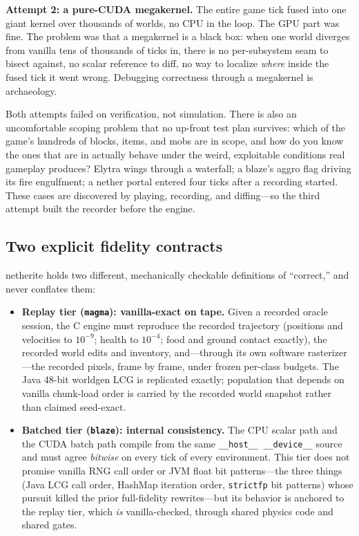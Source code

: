 \documentclass[11pt]{article}
\begin{document}
\textbf{Attempt 2: a pure-CUDA megakernel.} The entire game tick fused into one giant kernel over thousands of worlds, no CPU in the loop. The GPU part was fine. The problem was that a megakernel is a black box: when one world diverges from vanilla tens of thousands of ticks in, there is no per-subsystem seam to bisect against, no scalar reference to diff, no way to localize \emph{where} inside the fused tick it went wrong. Debugging correctness through a megakernel is archaeology.

Both attempts failed on verification, not simulation. There is also an uncomfortable scoping problem that no up-front test plan survives: which of the game's hundreds of blocks, items, and mobs are in scope, and how do you know the ones that are in actually behave under the weird, exploitable conditions real gameplay produces? Elytra wings through a waterfall; a blaze's aggro flag driving its fire engulfment; a nether portal entered four ticks after a recording started. These cases are discovered by playing, recording, and diffing---so the third attempt built the recorder before the engine.

\subsection{Two explicit fidelity contracts}
\label{sec:contracts}

netherite holds two different, mechanically checkable definitions of ``correct,'' and never conflates them:

\begin{itemize}
\item \textbf{Replay tier (\texttt{magma}): vanilla-exact on tape.} Given a recorded oracle session, the C engine must reproduce the recorded trajectory (positions and velocities to $10^{-9}$; health to $10^{-4}$; food and ground contact exactly), the recorded world edits and inventory, and---through its own software rasterizer---the recorded pixels, frame by frame, under frozen per-class budgets. The Java 48-bit worldgen LCG is replicated exactly; population that depends on vanilla chunk-load order is carried by the recorded world snapshot rather than claimed seed-exact.
\item \textbf{Batched tier (\texttt{blaze}): internal consistency.} The CPU scalar path and the CUDA batch path compile from the same \texttt{\_\_host\_\_ \_\_device\_\_} source and must agree \emph{bitwise} on every tick of every environment. This tier does not promise vanilla RNG call order or JVM float bit patterns---the three things (Java LCG call order, HashMap iteration order, \texttt{strictfp} bit patterns) whose pursuit killed the prior full-fidelity rewrites---but its behavior is anchored to the replay tier, which \emph{is} vanilla-checked, through shared physics code and shared gates.
\end{itemize}
\end{document}

